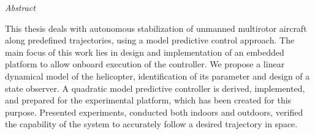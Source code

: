 \vfill
\begin{center}
{\it \large Abstract}
\vspace{0.2cm}

\begin{minipage}{0.8\textwidth}{
This thesis deals with autonomous stabilization of unmanned multirotor aircraft along predefined trajectories, using a model predictive control approach. The main focus of this work lies in design and implementation of an embedded platform to allow onboard execution of the controller. We propose a linear dynamical model of the helicopter, identification of its parameter and design of a state observer. A quadratic model predictive controller is derived, implemented, and prepared for the experimental platform, which has been created for this purpose. Presented experiments, conducted both indoors and outdoors, verified the capability of the system to accurately follow a desired trajectory in space. 
}
\end{minipage}
\end{center}
\vfill
\vspace{1cm}
